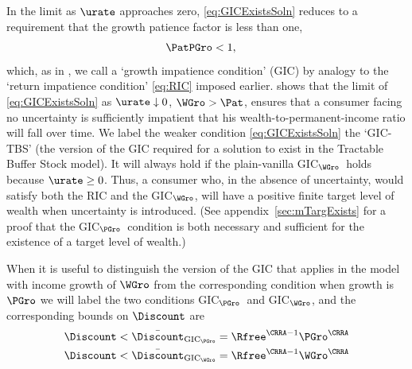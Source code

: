\documentclass{handout}
\begin{document}
\providecommand{\GICPGro}{GIC$_{\PGro}$}
\providecommand{\GICWGro}{GIC$_{\WGro}$}
In the limit as $\urate$ approaches zero, \eqref{eq:GICExistsSoln} reduces to a requirement that the growth patience factor is less than one,
\begin{equation}\begin{gathered}\begin{aligned}
  \PatPGro & <  1 \label{eq:GICPGro}
,\end{aligned}\end{gathered}\end{equation}
which, as in ,  we call a `growth impatience condition' (GIC) by analogy to the `return impatience condition' \eqref{eq:RIC} imposed earlier.   shows that the limit of \eqref{eq:GICExistsSoln} as $\urate \downarrow 0$, $\WGro > \Pat$, ensures that a consumer facing no uncertainty is sufficiently impatient that his wealth-to-permanent-income ratio will fall over time.  
We label the weaker condition \eqref{eq:GICExistsSoln} the `GIC-TBS' (the version of the GIC required for a solution to exist in the Tractable Buffer Stock model).  It will always hold if the plain-vanilla \GICWGro~holds because $\urate \geq 0$.  Thus, a consumer who, in the absence of uncertainty, would satisfy both the RIC and the \GICWGro, will have a positive finite target level of wealth when uncertainty is introduced.  (See appendix~\ref{sec:mTargExists} for a proof that the \GICPGro~condition is both necessary and sufficient for the existence of a target level of wealth.)

When it is useful to distinguish the version of the GIC that applies in the model with income growth of $\WGro$ from the corresponding condition when growth is $\PGro$ we will label the two conditions \GICPGro~and \GICWGro, and the corresponding bounds on $\Discount$ are 
\providecommand{\DiscountMaxGICPGro}{\bar{\Discount}_{\text{GIC}_\PGro}}
\providecommand{\DiscountMaxGICWGro}{\bar{\Discount}_{\text{GIC}_\WGro}}
\begin{equation}\begin{gathered}\begin{aligned}
   \Discount < \DiscountMaxGICPGro & =  \Rfree^{\CRRA-1}\PGro^{\CRRA}
\\ \Discount < \DiscountMaxGICWGro & =  \Rfree^{\CRRA-1}\WGro^{\CRRA}
\end{aligned}\end{gathered}\end{equation}
\end{document}
